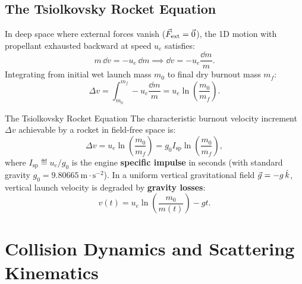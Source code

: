 \subsection{The Tsiolkovsky Rocket Equation}

In deep space where external forces vanish ($\vec{F}_{\text{ext}} = \vec{0}$), the 1D motion with propellant exhausted backward at speed $u_e$ satisfies:
\[
m\,\dd v = -u_e\,\dd m \implies \dd v = -u_e \frac{\dd m}{m}.
\]
Integrating from initial wet launch mass $m_0$ to final dry burnout mass $m_f$:
\[
\Delta v = \int_{m_0}^{m_f} -u_e \frac{\dd m}{m} = u_e \ln\left(\frac{m_0}{m_f}\right).
\]

\begin{lawbox}{The Tsiolkovsky Rocket Equation}
The characteristic burnout velocity increment $\Delta v$ achievable by a rocket in field-free space is:
\begin{equation}
\Delta v = u_e \ln\left(\frac{m_0}{m_f}\right) = g_0 I_{\text{sp}} \ln\left( \frac{m_0}{m_f} \right),
\end{equation}
where $I_{\text{sp}} \eqdef u_e/g_0$ is the engine \textbf{specific impulse} in seconds (with standard gravity $g_0 = 9.80665\ \mathrm{m\cdot s^{-2}}$).
In a uniform vertical gravitational field $\vec{g} = -g\,\hat{k}$, vertical launch velocity is degraded by \textbf{gravity losses}:
\begin{equation}
v(t) = u_e \ln\left( \frac{m_0}{m(t)} \right) - g t.
\end{equation}
\end{lawbox}

\section{Collision Dynamics and Scattering Kinematics}

